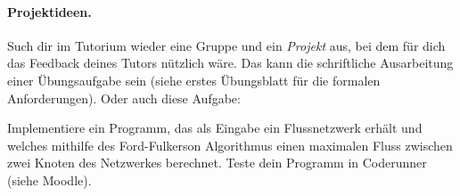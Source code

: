 \documentclass{uebung_cs}
\begin{document}
\paragraph*{Projektideen.}
Such dir im Tutorium wieder eine Gruppe und ein \emph{Projekt} aus, bei dem für dich das Feedback deines Tutors nützlich wäre.
Das kann die schriftliche Ausarbeitung einer Übungsaufgabe sein (siehe erstes Übungsblatt für die formalen Anforderungen). Oder auch diese Aufgabe:

\begin{exercise}
    Implementiere ein Programm, das als Eingabe ein Flussnetzwerk erhält und welches mithilfe des Ford-Fulkerson Algorithmus einen maximalen Fluss zwischen zwei Knoten des Netzwerkes berechnet.
    Teste dein Programm in Coderunner (siehe {Moodle}).
\end{exercise}
\end{document}

